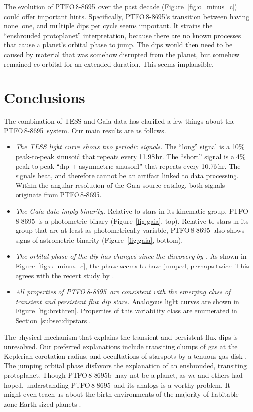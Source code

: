 \documentclass[12pt,twocolumn,tighten]{aastex62}
\newcommand{\ptfo}{PTFO$\,$8-8695}
\newcommand{\ptfob}{PTFO$\,$8-8695b}
\begin{document}
The evolution of \ptfo\ over the past decade
(Figure~\ref{fig:o_minus_c}) could offer important hints.
Specifically, \ptfo's transition between having none, one, and
multiple dips per cycle seems important.  It strains the ``enshrouded
protoplanet'' interpretation, because there are no known processes
that cause a planet's orbital phase to jump.  The dips would then need
to be caused by material that was somehow disrupted from the planet,
but somehow remained co-orbital for an extended duration. This seems
implausible.

\section{Conclusions}
\label{sec:conclusions}

The combination of TESS and Gaia data has clarified a few things about
the \ptfo\ system.  Our main results are as follows.
\begin{itemize}
  \item {\it The TESS light curve shows two periodic signals.} The
    ``long'' signal is a 10\% peak-to-peak sinusoid that repeats every
    11.98$\,$hr.  The ``short'' signal is a 4\% peak-to-peak ``dip +
    asymmetric sinusoid'' that repeats every 10.76$\,$hr. The signals
    beat, and therefore cannot be an artifact linked to data
    processing.  Within the angular resolution of the Gaia source
    catalog, both signals originate from \ptfo.
  \item {\it The Gaia data imply binarity.} Relative to stars in its
    kinematic group, \ptfo\ is a photometric binary
    (Figure~\ref{fig:gaia}, top).  Relative to stars in its group that
    are at least as photometrically variable, \ptfo\ also shows signs
    of astrometric binarity (Figure~\ref{fig:gaia}, bottom).
  \item {\it The orbital phase of the dip has changed since the
    discovery by \citet{van_eyken_ptf_2012}.} As shown in
    Figure~\ref{fig:o_minus_c}, the phase seems to have jumped,
    perhaps twice. This agrees with the recent study by
    \citet{tanimoto_evidence_2020}.
  \item {\it All properties of \ptfo\ are consistent with the emerging
    class of transient and persistent flux dip stars.} Analogous
    light curves are shown in Figure~\ref{fig:brethren}.  Properties of
    this variability class are enumerated in
    Section~\ref{subsec:dipstars}.
\end{itemize}

The physical mechanism that explains the transient and persistent flux
dips is unresolved. Our preferred explanations include transiting
clumps of gas at the Keplerian corotation radius, and occultations of
starspots by a tenuous gas disk \citep[{\it
e.g.},][]{stauffer_orbiting_2017,david_transient_2017,zhan_complex_2019}.
The jumping orbital phase disfavors the explanation of an enshrouded,
transiting protoplanet.  Though \ptfob\ may not be a planet, as we and
others had hoped, understanding \ptfo\ and its analogs is a worthy
problem.  It might even teach us about the birth environments of the
majority of habitable-zone Earth-sized planets
\citep{dressing_occurrence_2013}.
\end{document}
